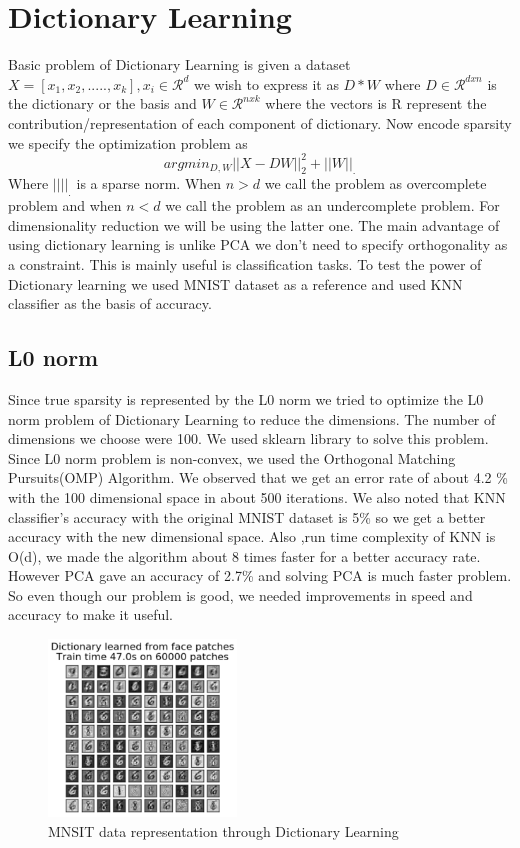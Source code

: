 \documentclass{article}
\begin{document}
\section{Dictionary Learning}
Basic problem of Dictionary Learning\cite{mairal2009online} is given a dataset $X = [x_{1},x_{2},.....,x_k], x_i \in \mathcal{R}^d$ we wish to express it as $D*W$ where $D \in \mathcal{R}^{d x n}$ is the dictionary or the basis and $W \in \mathcal{R}^{n x k} $ where the vectors is R represent the contribution/representation of each component of dictionary. Now encode sparsity we specify the optimization problem as \[ argmin_{D,W} ||X - DW||_2^2 + ||W||_{.} \] Where $|| ||_{.}$ is a sparse norm. When $n>d$ we call the problem as overcomplete problem and when $n<d$ we call the problem as an undercomplete problem. For dimensionality reduction we will be using the latter one. The main advantage of using dictionary learning is unlike PCA we don't need to specify orthogonality as a constraint. This is mainly useful is classification tasks. To test the power of Dictionary learning we used MNIST dataset\cite{lecun2010mnist} as a reference and used KNN classifier as the basis of accuracy.%
\subsection{L0 norm}
Since true sparsity is represented by the L0 norm we tried to optimize the L0 norm problem of Dictionary Learning to reduce the dimensions. The number of dimensions we choose were 100. We used sklearn\cite{pedregosa2011scikit} library to solve this problem. Since L0 norm problem is non-convex, we used the Orthogonal Matching Pursuits(OMP) Algorithm. We observed that we get an error rate of about 4.2 \% with the 100 dimensional space in about 500 iterations. We also noted that KNN classifier's accuracy with the original MNIST dataset is 5\% so we get a better accuracy with the new dimensional space. Also ,run time complexity of KNN is O(d), we made the algorithm about 8 times faster for a better accuracy rate. However PCA gave an accuracy of 2.7\% and solving PCA is much faster problem. So even though our problem is good, we needed improvements in speed and accuracy to make it useful.
\begin{figure}[ht]
\vskip 0.2in
\begin{center}
\centerline{\includegraphics[width=50mm,scale=1.0]{Dictionary.PNG}}
\caption{MNSIT data representation through Dictionary Learning}
\label{icml-historical}
\end{center}
\vskip -0.4in
\end{figure} 
\end{document}
